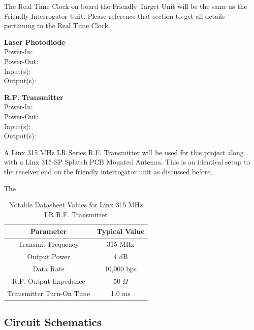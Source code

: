 \documentclass[letterpaper,10pt]{article}
\begin{document}
\begin{spacing}{1.15}
The Real Time Clock on board the Friendly Target Unit will be the same as the Friendly Interrogator Unit. Please reference that section to get all details pertaining to the Real Time Clock.

\normalsize\textbf{Laser Photodiode}\\
Power-In: \\
Power-Out: \\
Input(s): \\
Output(s):

\normalsize\textbf{R.F. Transmitter}\\
Power-In: \\
Power-Out: \\ 
Input(s): \\ 
Output(s):

A Linx 315 MHz LR Series R.F. Transmitter will be used for this project along with a Linx 315-SP Splatch PCB Mounted Antenna. This is an identical setup to the receiver end on the friendly interrogator unit as discussed before. 

The 

\begin{table}[htbp]
	\centering
	\begin{tabular}{c|c}	%
		\toprule	%
		Parameter & Typical Value \\
		\midrule
		Transmit Frequency & 315 MHz \\ 
		Output Power & 4 dB \\
		Data Rate & 10,000 bps \\
		R.F. Output Impedance & 50 $\Omega$ \\
		Transmitter Turn-On Time & 1.0 ms  \\
		\bottomrule	%
	\end{tabular}%
	\caption{Notable Datasheet Values for Linx 315 MHz LR R.F. Transmitter}
	\label{tab:table2}	%
\end{table}



\subsection{Circuit Schematics}


\end{spacing}
\end{document}

